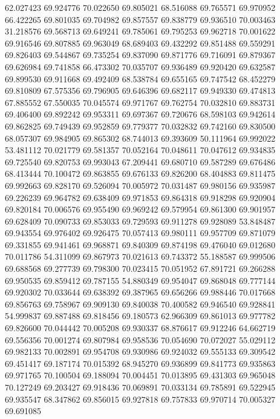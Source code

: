 62.027423
69.924776
70.022650
69.805021
68.516088
69.765571
69.970952
66.422265
69.801035
69.704982
69.857557
69.838779
69.936510
70.003463
31.218576
69.568713
69.649241
69.785061
69.795253
69.962718
70.001622
69.916546
69.807885
69.963049
68.689403
69.432292
69.851488
69.559291
69.826403
69.544867
69.735254
69.837090
69.871776
69.716091
69.879367
69.626984
69.741858
66.473302
70.035707
69.936489
69.920420
69.632587
69.899530
69.911668
69.492409
68.538784
69.655165
69.747542
68.452279
69.810809
67.575356
69.796905
69.646396
69.682117
69.949330
69.474813
67.885552
67.550035
70.045574
69.971767
69.762754
70.032810
69.883731
69.406400
69.892242
69.953311
69.697367
69.720676
68.598103
69.942614
69.862825
69.749439
69.952859
69.779377
70.032832
69.742160
69.830500
68.057307
69.984905
69.865302
68.744013
69.393609
50.111964
69.992022
53.481112
70.021779
69.581357
70.052164
70.048611
70.047612
69.934835
69.725540
69.820753
69.993043
67.209441
69.680710
69.587289
69.676486
68.413444
70.100472
69.863855
69.676133
69.826200
68.404883
69.811475
69.992663
69.828170
69.526094
70.005972
70.031487
69.980156
69.935987
69.226239
69.964782
69.638409
69.971853
69.864318
69.918298
69.920904
69.820184
70.006576
69.955490
69.969242
69.579954
69.861300
69.901957
69.628409
70.090733
69.853033
69.729593
69.911278
69.928089
53.848487
69.943554
69.976402
69.926475
70.057413
69.980111
69.957709
69.871079
69.331855
69.941461
69.968871
69.840309
69.874198
69.476040
69.012680
70.011786
54.311099
69.867973
70.021613
69.743372
55.188587
69.999506
69.688568
69.277739
69.798300
70.023415
70.051952
67.891721
69.266288
69.950535
69.859412
69.787155
54.880349
69.954047
69.868048
69.777144
69.920302
70.033644
69.638392
69.387965
69.656266
69.988446
70.017668
69.856763
69.758967
69.909130
69.840038
70.400582
69.946540
69.928841
54.999837
69.887488
69.818456
69.180573
62.966309
69.861013
69.977782
69.826600
70.044442
70.005208
69.930337
68.876617
69.912246
64.662719
69.556356
70.001274
69.807984
69.958536
70.054690
70.072027
55.029112
69.982133
70.002891
69.954708
69.930986
69.924032
69.555133
69.309542
69.451417
69.187174
70.015392
68.945270
69.936899
69.841773
69.935863
69.971765
70.100504
69.188094
70.004451
70.013895
69.431303
69.965048
70.127249
69.203427
69.918436
70.069891
70.033134
69.785891
69.522945
69.935547
68.347862
69.856015
69.927818
69.757833
69.970714
70.005327
69.691085

